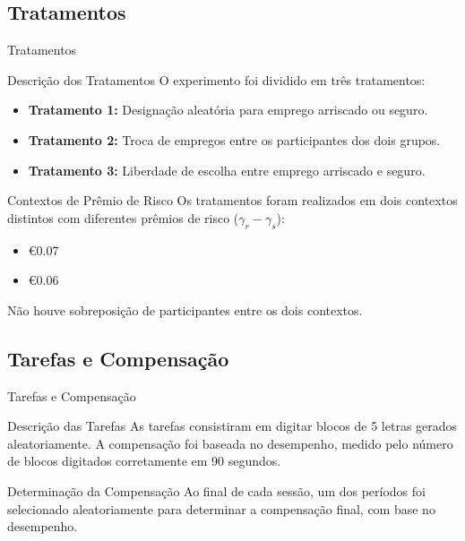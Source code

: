 \documentclass[aspectratio=169, xcolor={dvipsnames}, 10pt, brazil]{beamer}
\begin{document}
\subsection{Tratamentos}
\begin{frame}{Tratamentos}

    \begin{block}{Descrição dos Tratamentos}
        O experimento foi dividido em três tratamentos:
        \begin{itemize}
            \item \textbf{Tratamento 1:} Designação aleatória para emprego arriscado ou seguro.
            \item \textbf{Tratamento 2:} Troca de empregos entre os participantes dos dois grupos.
            \item \textbf{Tratamento 3:} Liberdade de escolha entre emprego arriscado e seguro.
        \end{itemize}
    \end{block}

    \begin{block}{Contextos de Prêmio de Risco}
        Os tratamentos foram realizados em dois contextos distintos com diferentes prêmios de risco (\( \gamma_r - \gamma_s \)):
        \begin{itemize}
            \item €0.07
            \item €0.06
        \end{itemize}
        Não houve sobreposição de participantes entre os dois contextos.
    \end{block}

\end{frame}

\subsection{Tarefas e Compensação}
\begin{frame}{Tarefas e Compensação}

    \begin{block}{Descrição das Tarefas}
        As tarefas consistiram em digitar blocos de 5 letras gerados aleatoriamente. A compensação foi baseada no desempenho, medido pelo número de blocos digitados corretamente em 90 segundos.
    \end{block}

    \begin{block}{Determinação da Compensação}
        Ao final de cada sessão, um dos períodos foi selecionado aleatoriamente para determinar a compensação final, com base no desempenho.
    \end{block}

\end{frame}
\end{document}
